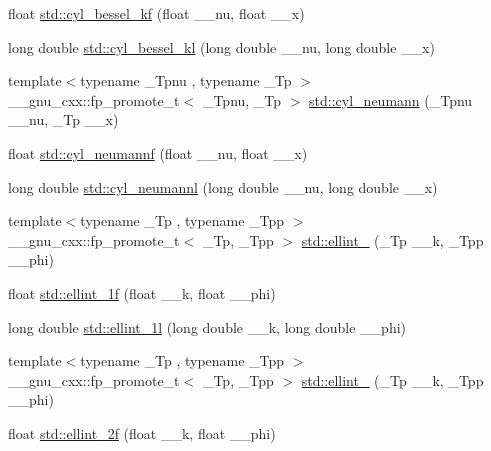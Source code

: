 \begin{DoxyCompactItemize}
float \hyperlink{group__tr29124__math__spec__func_ga1f50047f9aab0ec8b1a1615fe9fbe32f}{std\+::cyl\+\_\+bessel\+\_\+kf} (float \+\_\+\+\_\+nu, float \+\_\+\+\_\+x)
\item 
long double \hyperlink{group__tr29124__math__spec__func_gac35194b926270d7857d651e06198c7d3}{std\+::cyl\+\_\+bessel\+\_\+kl} (long double \+\_\+\+\_\+nu, long double \+\_\+\+\_\+x)
\item 
{\footnotesize template$<$typename \+\_\+\+Tpnu , typename \+\_\+\+Tp $>$ }\\\+\_\+\+\_\+gnu\+\_\+cxx\+::fp\+\_\+promote\+\_\+t$<$ \+\_\+\+Tpnu, \+\_\+\+Tp $>$ \hyperlink{group__tr29124__math__spec__func_ga1e4bef23704469b0704cf15c5f04e29e}{std\+::cyl\+\_\+neumann} (\+\_\+\+Tpnu \+\_\+\+\_\+nu, \+\_\+\+Tp \+\_\+\+\_\+x)
\item 
float \hyperlink{group__tr29124__math__spec__func_ga604c13e8f2bb7cd3c7c91d8b19d6b13a}{std\+::cyl\+\_\+neumannf} (float \+\_\+\+\_\+nu, float \+\_\+\+\_\+x)
\item 
long double \hyperlink{group__tr29124__math__spec__func_gaf8986bae9a523c48d861d233835bda8f}{std\+::cyl\+\_\+neumannl} (long double \+\_\+\+\_\+nu, long double \+\_\+\+\_\+x)
\item 
{\footnotesize template$<$typename \+\_\+\+Tp , typename \+\_\+\+Tpp $>$ }\\\+\_\+\+\_\+gnu\+\_\+cxx\+::fp\+\_\+promote\+\_\+t$<$ \+\_\+\+Tp, \+\_\+\+Tpp $>$ \hyperlink{group__tr29124__math__spec__func_ga1550d6947bbbeee9865aabd398102a36}{std\+::ellint\+\_} (\+\_\+\+Tp \+\_\+\+\_\+k, \+\_\+\+Tpp \+\_\+\+\_\+phi)
\item 
float \hyperlink{group__tr29124__math__spec__func_ga308d23d70f4b5e848eb7a4173628ef3b}{std\+::ellint\+\_\+1f} (float \+\_\+\+\_\+k, float \+\_\+\+\_\+phi)
\item 
long double \hyperlink{group__tr29124__math__spec__func_ga795383fa51e02351000b410b478d824f}{std\+::ellint\+\_\+1l} (long double \+\_\+\+\_\+k, long double \+\_\+\+\_\+phi)
\item 
{\footnotesize template$<$typename \+\_\+\+Tp , typename \+\_\+\+Tpp $>$ }\\\+\_\+\+\_\+gnu\+\_\+cxx\+::fp\+\_\+promote\+\_\+t$<$ \+\_\+\+Tp, \+\_\+\+Tpp $>$ \hyperlink{group__tr29124__math__spec__func_gad64cb9babb7837d585912b1a94b2cb7d}{std\+::ellint\+\_} (\+\_\+\+Tp \+\_\+\+\_\+k, \+\_\+\+Tpp \+\_\+\+\_\+phi)
\item 
float \hyperlink{group__tr29124__math__spec__func_ga594a730163c6228c75b152462700062b}{std\+::ellint\+\_\+2f} (float \+\_\+\+\_\+k, float \+\_\+\+\_\+phi)

\end{DoxyCompactItemize}
